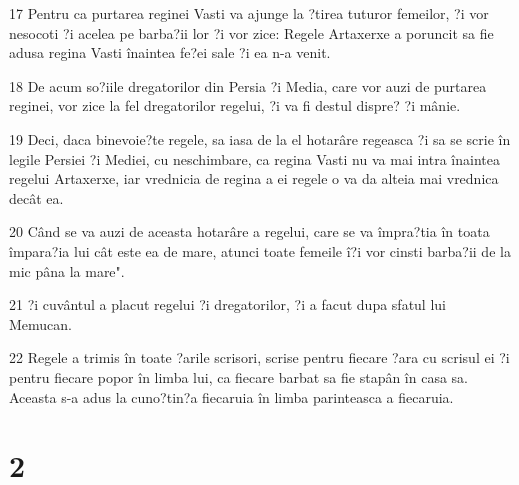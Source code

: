 \par 17 Pentru ca purtarea reginei Vasti va ajunge la ?tirea tuturor femeilor, ?i vor nesocoti ?i acelea pe barba?ii lor ?i vor zice: Regele Artaxerxe a poruncit sa fie adusa regina Vasti înaintea fe?ei sale ?i ea n-a venit.
\par 18 De acum so?iile dregatorilor din Persia ?i Media, care vor auzi de purtarea reginei, vor zice la fel dregatorilor regelui, ?i va fi destul dispre? ?i mânie.
\par 19 Deci, daca binevoie?te regele, sa iasa de la el hotarâre regeasca ?i sa se scrie în legile Persiei ?i Mediei, cu neschimbare, ca regina Vasti nu va mai intra înaintea regelui Artaxerxe, iar vrednicia de regina a ei regele o va da alteia mai vrednica decât ea.
\par 20 Când se va auzi de aceasta hotarâre a regelui, care se va împra?tia în toata împara?ia lui cât este ea de mare, atunci toate femeile î?i vor cinsti barba?ii de la mic pâna la mare".
\par 21 ?i cuvântul a placut regelui ?i dregatorilor, ?i a facut dupa sfatul lui Memucan.
\par 22 Regele a trimis în toate ?arile scrisori, scrise pentru fiecare ?ara cu scrisul ei ?i pentru fiecare popor în limba lui, ca fiecare barbat sa fie stapân în casa sa. Aceasta s-a adus la cuno?tin?a fiecaruia în limba parinteasca a fiecaruia.

\chapter{2}

